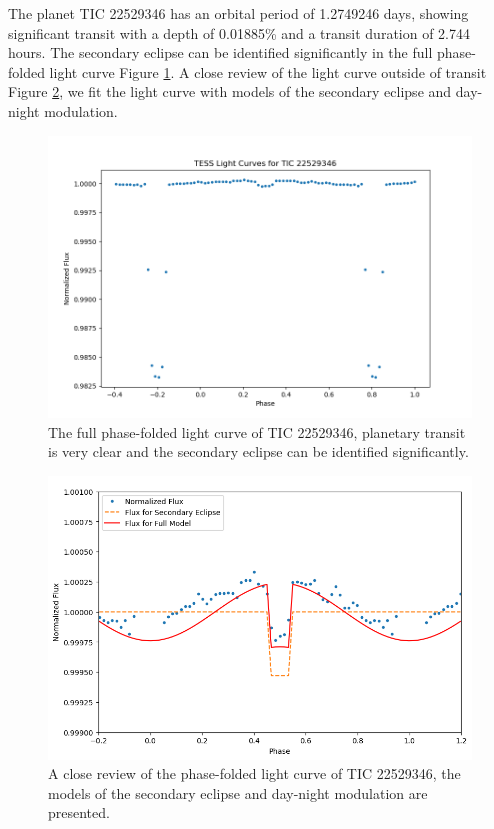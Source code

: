 \documentclass{article}
\begin{document}
The planet TIC 22529346 has an orbital period of 1.2749246 days, showing significant transit with a depth of 0.01885\% and a transit duration of 2.744 hours. The secondary eclipse can be identified significantly in the full phase-folded light curve Figure \ref{fig:22529346_folded}. A close review of the light curve outside of transit Figure \ref{fig:22529346}, we fit the light curve with models of the secondary eclipse and day-night modulation.\begin{figure}[H]\centering\includegraphics[width=0.7\linewidth]{image/22529346_folded.png}\captionsetup{font=small} \caption{The full phase-folded light curve of TIC 22529346, planetary transit is very clear and the secondary eclipse can be identified significantly.}\label{fig:22529346_folded}\end{figure}\begin{figure}[H]\centering\includegraphics[width=0.65\linewidth]{image/22529346.png}\captionsetup{font=small} \caption{A close review of the phase-folded light curve of TIC 22529346, the models of the secondary eclipse and day-night modulation are presented.}\label{fig:22529346}\end{figure}
\newpage
\end{document}
